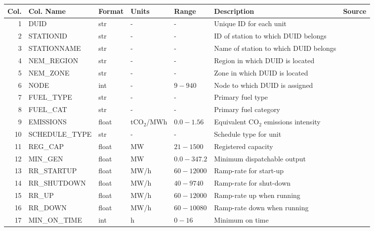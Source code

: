 \begin{tabular}{rllllll}
\toprule
 Col. &                     Col. Name & Format &          Units &        Range &                                                Description &                 Source\tnote{$\dagger$} \\
\midrule
 1 &  DUID &  str &  - &  - &  Unique ID for each unit &  \cite{aemo_data_2018} \\
 2 &  STATIONID &  str &  - &  - &  ID of station to which DUID belongs &  \cite{aemo_data_2018} \\
 3 &  STATIONNAME &  str &  - &  - &  Name of station to which DUID belongs &  \cite{aemo_data_2018} \\
 4 &  NEM\_REGION &  str &  - &  - &  Region in which DUID is located &   \\
 5 &  NEM\_ZONE &  str &  - &  - &  Zone in which DUID is located &   \\
 6 &  NODE &  int &  - &  $9-940$ &  Node to which DUID is assigned &   \\
 7 &  FUEL\_TYPE &  str &  - &  - &  Primary fuel type &  \cite{aemo_data_2018} \\
 8 &  FUEL\_CAT &  str &  - &  - &  Primary fuel category &   \\
 9 &  EMISSIONS &  float &  tCO$_{2}$/MWh &  $0.0-1.56$ &  Equivalent CO$_{2}$ emissions intensity &  \cite{aemo_current_2018} \\
 10 &  SCHEDULE\_TYPE &  str &  - &  - &  Schedule type for unit &  \cite{aemo_data_2018} \\
 11 &  REG\_CAP &  float &  MW &  $21-1500$ &  Registered capacity &  \cite{aemo_data_2018} \\
 12 &  MIN\_GEN &  float &  MW &  $0.0-347.2$ &  Minimum dispatchable output &  \cite{aemo_data_2018, aemo_ntndp_2018} \\
 13 &  RR\_STARTUP &  float &  MW/h &  $60-12000$ &  Ramp-rate for start-up &  \cite{aemo_ntndp_2018} \\
 14 &  RR\_SHUTDOWN &  float &  MW/h &  $40-9740$ &  Ramp-rate for shut-down &  \cite{aemo_ntndp_2018} \\
 15 &  RR\_UP &  float &  MW/h &  $60-12000$ &  Ramp-rate up when running &  \cite{aemo_ntndp_2018} \\
 16 &  RR\_DOWN &  float &  MW/h &  $60-10080$ &  Ramp-rate down when running &  \cite{aemo_ntndp_2018} \\
 17 &  MIN\_ON\_TIME &  int &  h &  $0-16$ &  Minimum on time &  \cite{aemo_ntndp_2018} \\

\end{tabular}
